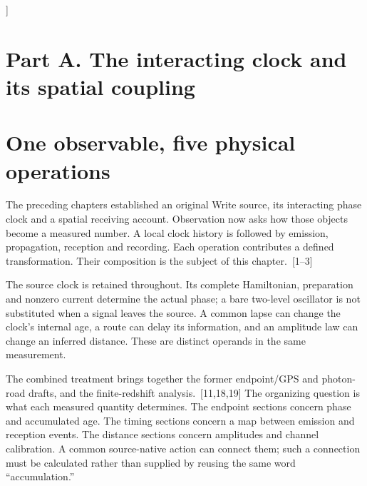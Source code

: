\documentclass[10pt,twocolumn,letterpaper]{article}
\begin{document}
{\begin{minipage}{0.97\textwidth}
\end{minipage}\vspace{0.9em}
}]

\section*{Part A. The interacting clock and its spatial coupling}

\section{One observable, five physical operations}
The preceding chapters established an original Write source, its interacting phase clock and a spatial receiving account. Observation now asks how those objects become a measured number. A local clock history is followed by emission, propagation, reception and recording. Each operation contributes a defined transformation. Their composition is the subject of this chapter.~[1--3]

The source clock is retained throughout. Its complete Hamiltonian, preparation and nonzero current determine the actual phase; a bare two-level oscillator is not substituted when a signal leaves the source. A common lapse can change the clock's internal age, a route can delay its information, and an amplitude law can change an inferred distance. These are distinct operands in the same measurement.

The combined treatment brings together the former endpoint/GPS and photon-road drafts, and the finite-redshift analysis.~[11,18,19] The organizing question is what each measured quantity determines. The endpoint sections concern phase and accumulated age. The timing sections concern a map between emission and reception events. The distance sections concern amplitudes and channel calibration. A common source-native action can connect them; such a connection must be calculated rather than supplied by reusing the same word ``accumulation.''
\end{document}
